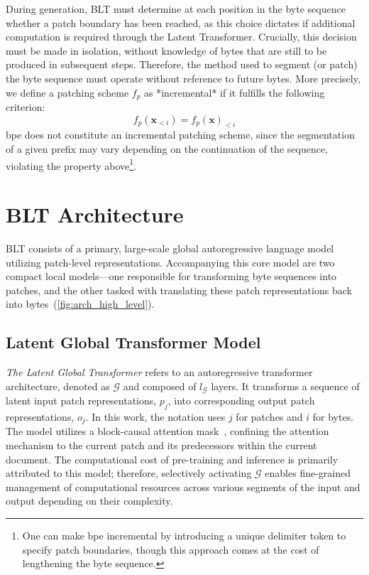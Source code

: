 During generation, {\textsc BLT} must determine at each position in the byte sequence whether a patch boundary has been reached, as this choice dictates if additional computation is required through the Latent Transformer. Crucially, this decision must be made in isolation, without knowledge of bytes that are still to be produced in subsequent steps. Therefore, the method used to segment (or patch) the byte sequence must operate without reference to future bytes. More precisely, we define a patching scheme $f_p$ as *incremental* if it fulfills the following criterion:
$$f_p(\pmb{x}_{<i}) = f_p(\pmb{x})_{<i}$$
bpe does not constitute an incremental patching scheme, since the segmentation of a given prefix may vary depending on the continuation of the sequence, violating the property above\footnote{One can make bpe incremental by introducing a unique delimiter token to specify patch boundaries, though this approach comes at the cost of lengthening the byte sequence.}.

\section{{\textsc BLT} Architecture}
\label{section:architecture}
{\textsc BLT} consists of a primary, large-scale global autoregressive language model utilizing patch-level representations. Accompanying this core model are two compact local models—one responsible for transforming byte sequences into patches, and the other tasked with translating these patch representations back into bytes~(\autoref{fig:arch_high_level}).

\subsection{Latent Global Transformer Model}

\textit{The Latent Global Transformer} refers to an autoregressive transformer architecture, denoted as $\mathcal{G}$ and composed of $l_{\mathcal{G}}$ layers. It transforms a sequence of latent input patch representations, $p_j$, into corresponding output patch representations, $o_j$. In this work, the notation uses $j$ for patches and $i$ for bytes. The model utilizes a block-causal attention mask~\citep{dubey2024llama}, confining the attention mechanism to the current patch and its predecessors within the current document. The computational cost of pre-training and inference is primarily attributed to this model; therefore, selectively activating $\mathcal{G}$ enables fine-grained management of computational resources across various segments of the input and output depending on their complexity.

